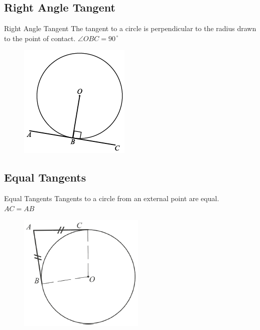 \documentclass{beamer}
\begin{document}
\subsection{Right Angle Tangent}
\begin{frame}{Right Angle Tangent}
The tangent to a circle is perpendicular to the radius drawn to the point of contact.
$\angle OBC = 90^{\,\circ}$
\begin{figure}[h!]
	\centering
	\includegraphics[height=0.5\textheight]{Graphics/Week_13/RightAngleTangent.png}
\end{figure}
\end{frame}

\subsection{Equal Tangents}
\begin{frame}{Equal Tangents}
Tangents to a circle from an external point are equal.\\
$AC=AB$
\begin{figure}[h!]
	\centering
	\includegraphics[height=0.5\textheight]{Graphics/Week_13/EqualTangents.png}
\end{figure}
\end{frame}
\end{document}
